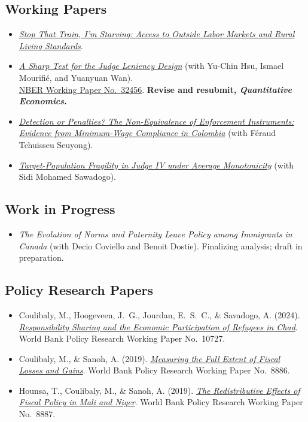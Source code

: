 \documentclass[11pt,letterpaper]{article}
\begin{document}
\subsection{Working Papers}
\begin{itemize}
  \item \href{https://mocoul.github.io/files/COULIBALY_Stop_That_Train.pdf}{\textit{Stop That Train, I'm Starving: Access to Outside Labor Markets and Rural Living Standards}}.
  \item \href{https://mocoul.github.io/files/A_Sharp_Test_for_the_Judge_Leniency_Design.pdf}{\textit{A Sharp Test for the Judge Leniency Design}} (with Yu-Chin Hsu, Ismael Mourifi\'e, and Yuanyuan Wan).\\
  \href{https://www.nber.org/papers/w32456}{NBER Working Paper No.\ 32456}. \textbf{Revise and resubmit, \textit{Quantitative Economics}.}
  \item \href{https://mocoul.github.io/files/Non_Equivalence_of_Enforcement_Instruments.pdf}{\textit{Detection or Penalties? The Non-Equivalence of Enforcement Instruments: Evidence from Minimum-Wage Compliance in Colombia}} (with F\'eraud Tchuisseu Seuyong).
  \item \href{https://mocoul.github.io/files/Average_monotonicity.pdf}{\textit{Target-Population Fragility in Judge IV under Average Monotonicity}} (with Sidi Mohamed Sawadogo).
\end{itemize}

\subsection{Work in Progress}
\begin{itemize}
  \item \textit{The Evolution of Norms and Paternity Leave Policy among Immigrants in Canada} (with Decio Coviello and Benoit Dostie). Finalizing analysis; draft in preparation.
\end{itemize}

\subsection{Policy Research Papers}
\begin{itemize}
  \item Coulibaly, M., Hoogeveen, J.~G., Jourdan, E.~S.~C., \& Savadogo, A. (2024).
  \href{http://documents.worldbank.org/curated/en/099221203202438286}{\textit{Responsibility Sharing and the Economic Participation of Refugees in Chad}}. World Bank Policy Research Working Paper No.\ 10727.
  \item Coulibaly, M., \& Sanoh, A. (2019).
  \href{http://documents.worldbank.org/curated/en/529981560446527788}{\textit{Measuring the Full Extent of Fiscal Losses and Gains}}. World Bank Policy Research Working Paper No.\ 8886.
  \item Hounsa, T., Coulibaly, M., \& Sanoh, A. (2019).
  \href{http://documents.worldbank.org/curated/en/307791560775408803}{\textit{The Redistributive Effects of Fiscal Policy in Mali and Niger}}. World Bank Policy Research Working Paper No.\ 8887.
\end{itemize}
\end{document}
